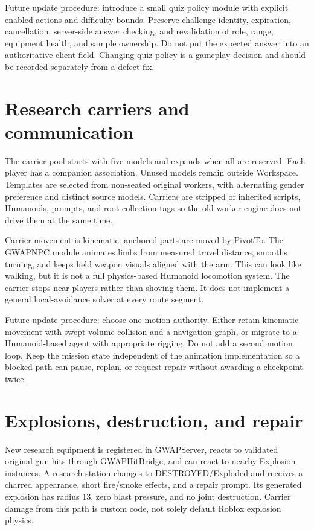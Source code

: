 Future update procedure: introduce a small quiz policy module with explicit enabled actions and difficulty bounds.\allowbreak{} Preserve challenge identity, expiration, cancellation, server-side answer checking, and revalidation of role, range, equipment health, and sample ownership.\allowbreak{} Do not put the expected answer into an authoritative client field.\allowbreak{} Changing quiz policy is a gameplay decision and should be recorded separately from a defect fix.\allowbreak{}

\section{Research carriers and communication}
The carrier pool starts with five models and expands when all are reserved.\allowbreak{} Each player has a companion association.\allowbreak{} Unused models remain outside Workspace.\allowbreak{} Templates are selected from non-seated original workers, with alternating gender preference and distinct source models.\allowbreak{} Carriers are stripped of inherited scripts, Humanoids, prompts, and root collection tags so the old worker engine does not drive them at the same time.\allowbreak{}

Carrier movement is kinematic: anchored parts are moved by PivotTo.\allowbreak{} The GWAPNPC module animates limbs from measured travel distance, smooths turning, and keeps held weapon visuals aligned with the arm.\allowbreak{} This can look like walking, but it is not a full physics-based Humanoid locomotion system.\allowbreak{} The carrier stops near players rather than shoving them.\allowbreak{} It does not implement a general local-avoidance solver at every route segment.\allowbreak{}

Future update procedure: choose one motion authority.\allowbreak{} Either retain kinematic movement with swept-volume collision and a navigation graph, or migrate to a Humanoid-based agent with appropriate rigging.\allowbreak{} Do not add a second motion loop.\allowbreak{} Keep the mission state independent of the animation implementation so a blocked path can pause, replan, or request repair without awarding a checkpoint twice.\allowbreak{}

\section{Explosions, destruction, and repair}
New research equipment is registered in GWAPServer, reacts to validated original-gun hits through GWAPHitBridge, and can react to nearby Explosion instances.\allowbreak{} A research station changes to DESTROYED/\allowbreak{}Exploded and receives a charred appearance, short fire/\allowbreak{}smoke effects, and a repair prompt.\allowbreak{} Its generated explosion has radius 13, zero blast pressure, and no joint destruction.\allowbreak{} Carrier damage from this path is custom code, not solely default Roblox explosion physics.\allowbreak{}

